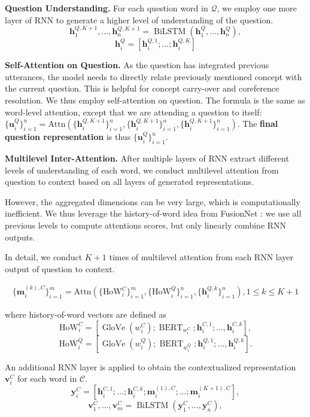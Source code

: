 \documentclass{article} \usepackage{sdnet,times}
\newcommand{\B}[1] {\boldsymbol{#1}}
\def\bh{{\B{h}}}
\def\bm{{\B{m}}}
\def\bu{{\B{u}}}
\def\bv{{\B{v}}}
\def\by{{\B{y}}}
\DeclareMathOperator{\BiLSTM}{\mbox{BiLSTM}}
\DeclareMathOperator{\bert}{\mbox{BERT}}
\DeclareMathOperator{\glove}{GloVe}
\begin{document}
\textbf{Question Understanding.} For each question word in $\mathcal{Q}$, we employ one more layer of RNN to generate a higher level of understanding of the question.
$$
\bh_1^{Q,K+1}, ..., \bh_n^{Q,K+1} = \BiLSTM{(\bh_1^{Q}, ..., \bh_n^{Q})},
$$
$$
\bh_i^{Q} = [\bh_i^{Q,1};...;\bh_i^{Q,K}]
$$

\textbf{Self-Attention on Question.} As the question has integrated previous utterances, the model needs to directly relate previously mentioned concept with the current question. This is helpful for concept carry-over and coreference resolution. We thus employ self-attention on question. The formula is the same as word-level attention, except that we are attending a question to itself: $\{\bu_i^Q\}_{i=1}^n=\mbox{Attn}(\{\bh_i^{Q,K+1}\}_{i=1}^n, \{\bh_i^{Q,K+1}\}_{i=1}^n, \{\bh_i^{Q,K+1}\}_{i=1}^n)$. The \textbf{final question representation} is thus $\{\bu_i^Q\}_{i=1}^n$.

\textbf{Multilevel Inter-Attention.} After multiple layers of RNN extract different levels of understanding of each word, we conduct multilevel attention from question to context based on all layers of generated representations.

However, the aggregated dimensions can be very large, which is computationally inefficient. We thus leverage the history-of-word idea from FusionNet \citep{fusionnet}: we use all previous levels to compute attentions scores, but only linearly combine RNN outputs.

In detail, we conduct $K+1$ times of multilevel attention from each RNN layer output of question to context.

\begin{align*}
\{\bm_i^{(k),C}\}_{i=1}^m=\mbox{Attn}(\{\mbox{HoW}_i^C\}_{i=1}^m, \{\mbox{HoW}_i^Q\}_{i=1}^n,\{\bh_i^{Q,k}\}_{i=1}^n), 1\leq k \leq K+1
\end{align*}

where history-of-word vectors are defined as
$$\mbox{HoW}_i^C = [\glove(w_i^C); \bert_{w_i^C}; \bh_i^{C,1}; ..., \bh_i^{C,k}],$$
$$\mbox{HoW}_i^Q = [\glove(w_i^Q); \bert_{w_i^Q}; \bh_i^{Q,1}; ..., \bh_i^{Q,k}].$$

An additional RNN layer is applied to obtain the contextualized representation $\bv_i^C$ for each word in $\mathcal{C}$.
$$
\by_i^C = [\bh_i^{C,1}; ...; \bh_i^{C,k}; \bm_i^{(1),C}; ...; \bm_i^{(K+1),C}],
$$
$$
\bv_1^{C}, ..., \bv_m^{C} = \BiLSTM{(\by_1^{C}, ..., \by_n^{C})},
$$
\end{document}
